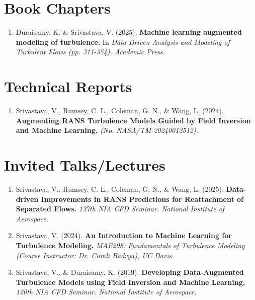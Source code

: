 \documentclass[letterpaper, 11pt]{article}
\begin{document}

  \section{Book Chapters}
  {
    \small
    \begin{enumerate}
      \item
      Duraisamy, K. \& Srivastava, V. (2025).%
      \textbf{
        Machine learning augmented modeling of turbulence.
      }In\textit{
        Data Driven Analysis and Modeling of Turbulent Flows (pp. 311-354). Academic Press.
      }
    \end{enumerate}
  }

  \section{Technical Reports}
  {
    \small
    \begin{enumerate}
      \item
      Srivastava, V., Rumsey, C. L., Coleman, G. N., \& Wang, L. (2024).%
      \textbf{
        Augmenting RANS Turbulence Models Guided by Field Inversion and Machine Learning.%
      }\textit{
        (No. NASA/TM-20240012512).
      }
    \end{enumerate}
  }

  \section{Invited Talks/Lectures}
  {
    \small
    \begin{enumerate}
      \item
      Srivastava, V., Rumsey, C. L., Coleman, G. N., \& Wang, L. (2025).%
      \textbf{
        Data-driven Improvements in RANS Predictions for Reattachment of Separated Flows.%
      }\textit{
        137th NIA CFD Seminar. National Institute of Aerospace.
      }

      \item
      Srivastava, V. (2024).%
      \textbf{
        An Introduction to Machine Learning for Turbulence Modeling.%
      }\textit{
        MAE298: Fundamentals of Turbulence Modeling (Course Instructor: Dr. Camli Badrya), UC Davis
      }

      \item
      Srivastava, V., \& Duraisamy, K. (2019).%
      \textbf{
        Developing Data-Augmented Turbulence Models using Field Inversion and Machine Learning.%
      }\textit{
        120th NIA CFD Seminar. National Institute of Aerospace.
      }
    \end{enumerate}
  }
\end{document}
